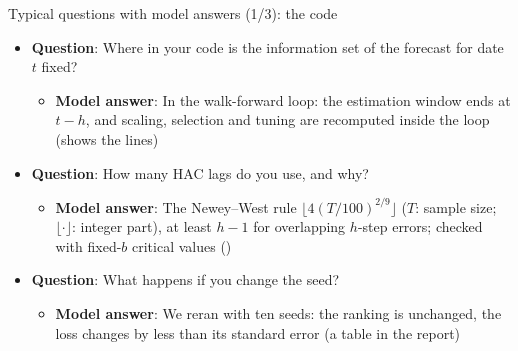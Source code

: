 \begin{frame}{Typical questions with model answers (1/3): the code}
\itemsize{\footnotesize}
\begin{itemize}
    \item \textbf{Question}: Where in your code is the information set of the forecast for date $t$ fixed?
    \begin{itemize}
        \item \textbf{Model answer}: In the walk-forward loop: the estimation window ends at $t - h$, and scaling, selection and tuning are recomputed inside the loop (shows the lines)
    \end{itemize}
    \item \textbf{Question}: How many HAC lags do you use, and why?
    \begin{itemize}
        \item \textbf{Model answer}: The Newey--West rule $\lfloor 4(T/100)^{2/9}\rfloor$ ($T$: sample size; $\lfloor\cdot\rfloor$: integer part), at least $h - 1$ for overlapping $h$-step errors; checked with fixed-$b$ critical values ()
    \end{itemize}
    \item \textbf{Question}: What happens if you change the seed?
    \begin{itemize}
        \item \textbf{Model answer}: We reran with ten seeds: the ranking is unchanged, the loss changes by less than its standard error (a table in the report)
    \end{itemize}
\end{itemize}
\end{frame}

